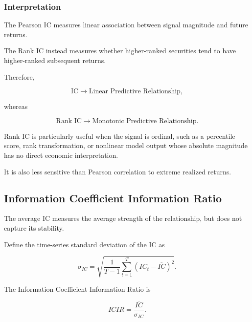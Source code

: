 \documentclass[11pt,a4paper]{article}
\begin{document}
\subsubsection{Interpretation}

The Pearson IC measures linear association between signal magnitude and future
returns.

The Rank IC instead measures whether higher-ranked securities tend to have
higher-ranked subsequent returns.

Therefore,

\begin{equation}
\boxed{
\text{IC}
\rightarrow
\text{Linear Predictive Relationship},
}
\end{equation}

whereas

\begin{equation}
\boxed{
\text{Rank IC}
\rightarrow
\text{Monotonic Predictive Relationship}.
}
\end{equation}

Rank IC is particularly useful when the signal is ordinal, such as a percentile
score, rank transformation, or nonlinear model output whose absolute magnitude
has no direct economic interpretation.

It is also less sensitive than Pearson correlation to extreme realized returns.


\subsection{Information Coefficient Information Ratio}
\label{subsec:information_coefficient_information_ratio}

The average IC measures the average strength of the relationship, but does not
capture its stability.

Define the time-series standard deviation of the IC as

\begin{equation}
\sigma_{IC}
=
\sqrt{
\frac{1}{T-1}
\sum_{t=1}^{T}
\left(
IC_t-\overline{IC}
\right)^2
}.
\end{equation}

The Information Coefficient Information Ratio is

\begin{equation}
\boxed{
ICIR
=
\frac{
\overline{IC}
}{
\sigma_{IC}
}.
}
\end{equation}
\end{document}
